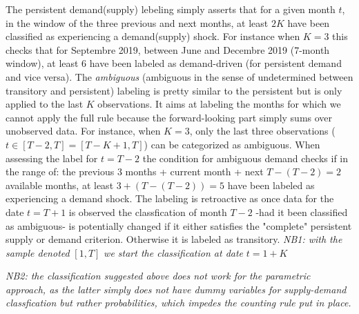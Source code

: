 The persistent demand(supply) lebeling simply asserts that for a given month $t$, in the window of the three previous and next months, at least $2K$ have been classified as experiencing a demand(supply) shock.
For instance when $K=3$ this checks that for Septembre 2019, between June and Decembre 2019 (7-month window), at least 6 have been labeled as demand-driven (for persistent demand and vice versa).
\bigbreak
The \textit{ambiguous} (ambiguous in the sense of undetermined between transitory and persistent) labeling is pretty similar to the persistent but is only applied to the last $K$ observations. 
It aims at labeling the months for which we cannot apply the full rule because the forward-looking part simply sums over unobserved data.
For instance, when $K=3$, only the last three observations ($t\in[T-2,T]=[T-K+1,T]$) can be categorized as ambiguous.
When assessing the label for $t=T-2$ the condition for ambiguous demand checks if in the range of: the previous 3 months + current month + next $T-(T-2)=2$ available months, at least $3+(T-(T-2))=5$ have been labeled as experiencing a demand shock.
\bigbreak
The labeling is retroactive as once data for the date $t=T+1$ is observed the classfication of month $T-2$ -had it been classified as ambiguous- is potentially changed if it either satisfies the "complete" persistent supply or demand criterion. 
Otherwise it is labeled as transitory.
\bigbreak
\textit{NB1: with the sample denoted }$[1,T]$\textit{ we start the classification at date }$t=1+K$

\textit{NB2: the classification suggested above does not work for the parametric approach, as the latter simply does not have dummy variables for supply-demand classfication but rather probabilities, which impedes the counting rule put in place.}


\clearpage